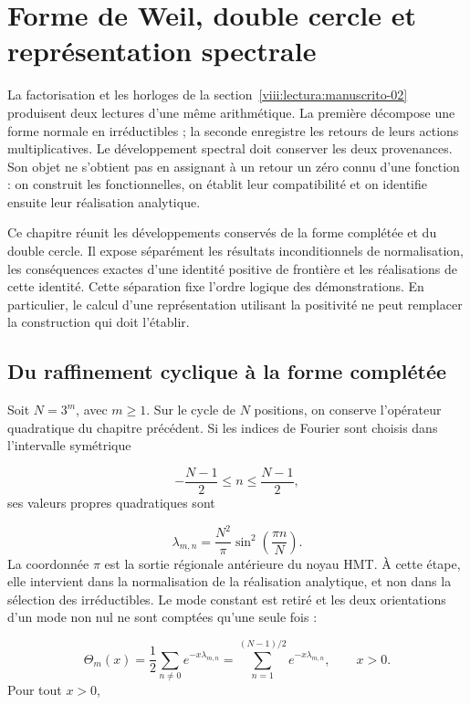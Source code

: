\section{Forme de Weil, double cercle et représentation spectrale}
\label{viii:lectura:manuscrito-03}
La factorisation et les horloges de la section~\ref{viii:lectura:manuscrito-02} produisent deux lectures d’une même arithmétique. La première décompose une forme normale en irréductibles ; la seconde enregistre les retours de leurs actions multiplicatives. Le développement spectral doit conserver les deux provenances. Son objet ne s’obtient pas en assignant à un retour un zéro connu d’une fonction : on construit les fonctionnelles, on établit leur compatibilité et on identifie ensuite leur réalisation analytique.

Ce chapitre réunit les développements conservés de la forme complétée et du double cercle. Il expose séparément les résultats inconditionnels de normalisation, les conséquences exactes d'une identité positive de frontière et les réalisations de cette identité. Cette séparation fixe l'ordre logique des démonstrations. En particulier, le calcul d'une représentation utilisant la positivité ne peut remplacer la construction qui doit l'établir.

\subsection{Du raffinement cyclique à la forme complétée}
Soit \(N=3^m\), avec \(m\geq1\). Sur le cycle de \(N\) positions, on conserve l'opérateur quadratique du chapitre précédent. Si les indices de Fourier sont choisis dans l'intervalle symétrique

\[
-\frac{N-1}{2}\leq n\leq\frac{N-1}{2},
\]
ses valeurs propres quadratiques sont

\[
\lambda_{m,n}=\frac{N^2}{\pi}\sin^2\!\left(\frac{\pi n}{N}\right).
\]
La coordonnée \(\pi\) est la sortie régionale antérieure du noyau HMT. À cette étape, elle intervient dans la normalisation de la réalisation analytique, et non dans la sélection des irréductibles. Le mode constant est retiré et les deux orientations d'un mode non nul ne sont comptées qu'une seule fois :

\[
\Theta_m(x)=\frac12\sum_{n\neq0}e^{-x\lambda_{m,n}}
=\sum_{n=1}^{(N-1)/2}e^{-x\lambda_{m,n}},\qquad x>0.
\]
Pour tout \(x>0\),

